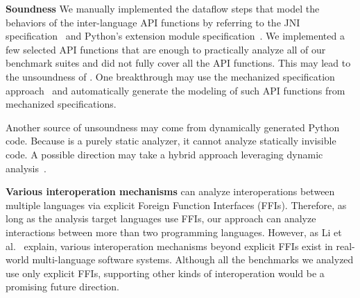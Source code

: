 {\textbf{Soundness} We manually implemented the dataflow steps that model
the behaviors of the inter-language API functions by referring to
the JNI specification~\cite{jnispec} and Python's extension module specification~\cite{pythoncspec}.
We implemented a few selected API functions that are enough to practically analyze
all of our benchmark suites and did not fully cover all the API functions.
This may lead to the unsoundness of \ours.
One breakthrough may use the mechanized specification approach~\cite{jiset,jest,jstar,jsaver,justgen} and
automatically generate the modeling of such API functions from mechanized specifications.

Another source of unsoundness may come from dynamically generated Python code.
Because \ours is a purely static analyzer, it cannot analyze statically invisible code.
A possible direction may take a hybrid approach leveraging dynamic analysis~\cite{polycruise}.

\textbf{Various interoperation mechanisms} \ours can analyze
interoperations between multiple languages via explicit Foreign Function Interfaces (FFIs).
Therefore, as long as the analysis target languages use FFIs, our
approach can analyze interactions between more than two programming languages.
However, as Li et al.~\cite{vulnerable-multi} explain, various
interoperation mechanisms beyond explicit FFIs exist in real-world multi-language software systems.
Although all the benchmarks we analyzed use only explicit FFIs,
supporting other kinds of interoperation would be a promising future direction.
}
